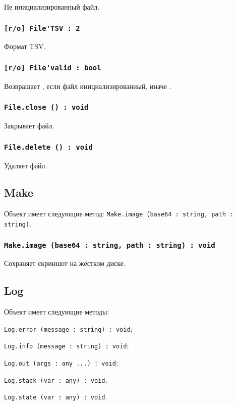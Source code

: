 Не инициализированный файл.

\subsubsection{\lstinline|[r/o] File'TSV : 2|}

Формат TSV.

\subsubsection{\lstinline|[r/o] File'valid : bool|}

Возвращает \true, если файл инициализированный, иначе \false.

\subsubsection{\lstinline|File.close () : void|}

Закрывает файл.

\subsubsection{\lstinline|File.delete () : void|}

Удаляет файл.

\subsection{{\color{orange} Make}}

Объект \make{} имеет следующие метод: \lstinline|Make.image (base64 : string, path : string)|.

\subsubsection{\lstinline|Make.image (base64 : string, path : string) : void|}

Сохраняет скриншот на жёстком диске.

\subsection{{\color{orange} Log}}

Объект \logtype{} имеет следующие методы:
\begin{icItems}
	\item \lstinline|Log.error (message : string) : void|;
	\item \lstinline|Log.info (message : string) : void|;
	\item \lstinline|Log.out (args : any ...) : void|;
	\item \lstinline|Log.stack (var : any) : void|;
	\item \lstinline|Log.state (var : any) : void|.
\end{icItems}

